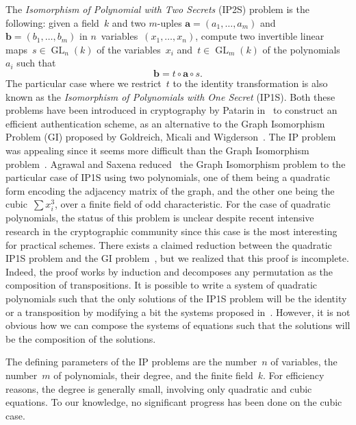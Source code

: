 \documentclass{article}%
\DeclareMathOperator\GL{GL}
\begin{document}
The \emph{Isomorphism of Polynomial with Two Secrets} (IP2S) problem is
the following: given a field~$k$ and two $m$-uples $\bm{a} = (a_1, …,
a_m)$ and~$\bm{b} = (b_1, …, b_m)$ in $n$~variables~$(x_1, …, x_n)$, compute
two invertible linear maps~$s ∈ \GL_n(k)$ of the variables~$x_i$
and~$t ∈ \GL_m(k)$ of the polynomials~$a_i$ such that
\begin{equation*}
\bm{b} = t ∘ \bm{a} ∘ s.
\end{equation*}
The particular case where we restrict~$t$ to the identity transformation
is also known as the \emph{Isomorphism of Polynomials with One Secret}
(IP1S). Both these problems have been introduced in cryptography by
Patarin in~\cite{DBLP:conf/eurocrypt/Patarin96} to construct an efficient
authentication scheme, 
as an alternative to the Graph Isomorphism Problem (GI) proposed by Goldreich, Micali and Wigderson~\cite{DBLP:journals/jacm/GoldreichMW91}.
The IP problem was appealing since 
it seems more difficult than the Graph Isomorphism problem~\cite{DBLP:conf/eurocrypt/PatarinGC98}. 
Agrawal and Saxena reduced~\cite{DBLP:conf/stacs/AgrawalS06} the Graph
Isomorphism problem to the particular case of IP1S using two polynomials,
one of them being a quadratic form encoding the adjacency matrix of the
graph, and the other one being the cubic~$\sum x_i^3$, over a finite field of
odd characteristic.
For the case of quadratic polynomials, the status of this problem is unclear despite recent 
intensive research in the cryptographic community since this case is the most interesting 
for practical schemes. There exists a claimed reduction between the quadratic IP1S problem and the GI
problem~\cite{DBLP:conf/eurocrypt/PatarinGC98}, but we realized that this proof is incomplete. 
Indeed, the proof works by induction and decomposes any permutation as the composition of 
transpositions. It is possible to write a system of quadratic polynomials such that the only solutions 
of the IP1S problem will be the identity or a transposition by modifying a bit the systems proposed 
in~\cite{DBLP:conf/eurocrypt/PatarinGC98}. However, it is not obvious how we can compose the systems 
of equations such that the solutions will be the composition of the solutions. 

\bigbreak

The defining parameters of the IP problems are the number~$n$ of
variables, the number~$m$ of polynomials, their degree, and the finite
field~$k$. For
efficiency reasons, the degree is generally small, involving only
quadratic and cubic equations. To our knowledge, no significant progress
has been done on the cubic case.
\end{document}
